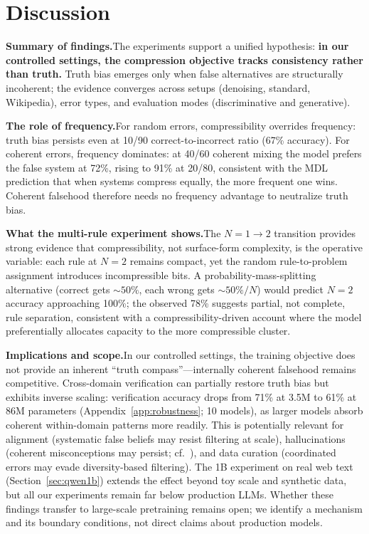 \documentclass{article}
\begin{document}
\section{Discussion}
\label{sec:discussion}

\textbf{Summary of findings.}\quad The experiments support a unified hypothesis: \textbf{in our controlled settings, the compression objective tracks consistency rather than truth.} Truth bias emerges only when false alternatives are structurally incoherent; the evidence converges across setups (denoising, standard, Wikipedia), error types, and evaluation modes (discriminative and generative).

\textbf{The role of frequency.}\quad For random errors, compressibility overrides frequency: truth bias persists even at 10/90 correct-to-incorrect ratio (67\% accuracy). For coherent errors, frequency dominates: at 40/60 coherent mixing the model prefers the false system at 72\%, rising to 91\% at 20/80, consistent with the MDL prediction that when systems compress equally, the more frequent one wins. Coherent falsehood therefore needs no frequency advantage to neutralize truth bias.

\textbf{What the multi-rule experiment shows.}\quad The $N{=}1 \to 2$ transition provides strong evidence that compressibility, not surface-form complexity, is the operative variable: each rule at $N{=}2$ remains compact, yet the random rule-to-problem assignment introduces incompressible bits. A probability-mass-splitting alternative (correct gets ${\sim}50\%$, each wrong gets ${\sim}50\%/N$) would predict $N{=}2$ accuracy approaching 100\%; the observed 78\% suggests partial, not complete, rule separation, consistent with a compressibility-driven account where the model preferentially allocates capacity to the more compressible cluster.

\textbf{Implications and scope.}\quad In our controlled settings, the training objective does not provide an inherent ``truth compass''---internally coherent falsehood remains competitive. Cross-domain verification can partially restore truth bias but exhibits inverse scaling: verification accuracy drops from 71\% at 3.5M to 61\% at 86M parameters (Appendix~\ref{app:robustness}; 10 models), as larger models absorb coherent within-domain patterns more readily. This is potentially relevant for alignment (systematic false beliefs may resist filtering at scale), hallucinations (coherent misconceptions may persist; cf.\ \citealp{kalai2024calibrated}), and data curation (coordinated errors may evade diversity-based filtering). The 1B experiment on real web text (Section~\ref{sec:qwen1b}) extends the effect beyond toy scale and synthetic data, but all our experiments remain far below production LLMs. Whether these findings transfer to large-scale pretraining remains open; we identify a mechanism and its boundary conditions, not direct claims about production models.
\end{document}
